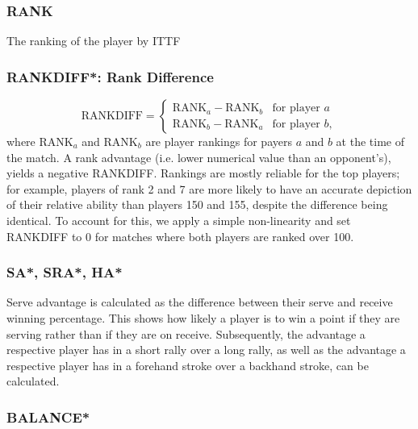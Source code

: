 \subsubsection*{RANK} \label{sec:rank}
The ranking of the player by ITTF 

\subsubsection*{RANKDIFF*: Rank Difference} \label{sec:rankdiff}
\begin{equation}
    \text{RANKDIFF} = \begin{cases}
\text{RANK}_a - \text{RANK}_b &\text{for player $a$} \\
\text{RANK}_b - \text{RANK}_a &\text{for player $b$},
\end{cases}
\end{equation}
where RANK$_a$ and RANK$_b$ are  player rankings for payers $a$ and $b$ at the time of the match. A rank advantage (i.e. lower numerical value than an opponent's), yields a negative RANKDIFF. Rankings are mostly reliable for the top players; for example, players of rank 2 and  7 are more likely to have an accurate depiction of their relative ability than players  150 and 155, despite the difference being identical. To account for this, we apply a simple non-linearity and set RANKDIFF to $0$ for matches where both players are ranked over 100.%


\subsubsection*{SA*, SRA*, HA*} \label{sec:advantage}
Serve advantage is calculated as the difference between their serve and receive winning percentage. This shows how likely a player is to win a point if they are serving rather than if they are on receive. Subsequently, the advantage a respective player has in a short rally over a long rally, as well as the advantage a respective player has in a forehand stroke over a backhand stroke, can be calculated.

\subsubsection*{BALANCE*} \label{sec:balance}

